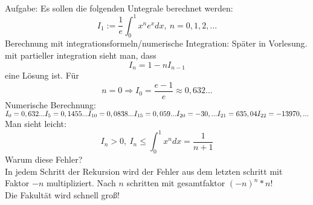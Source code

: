 \documentclass[../Skript.tex]{subfiles}
\begin{document}
\begin{example}\hfill\\
Aufgabe: Es sollen die folgenden Untegrale berechnet werden: $$I_1 := \frac{1}{e}\int^1_0 x^ne^x dx, \ n=0,1,2,...$$
Berechnung mit integrationsformeln/numerische Integration: Später in Vorlesung.\\
mit partieller integration sieht man, dass $$ I_n=1-nI_{n-1}$$
eine Lösung ist.
Für $$n=0 \Rightarrow I_0 = \frac{e-1}{e}\approx 0,632...$$
Numerische Berechnung: 
$I_0=0,632...\\
I_5= 0,1455...\\
I_{10}=0,0838...\\
I_{15}=0,059...\\
I_{20}=-30,...\\
I_{21}=635,04\\
I_{22}=-13970,...$\\
Man sieht leicht: $$I_n>0, \ I_n \leq \int^1_0x^ndx=\frac{1}{n+1}$$
Warum diese Fehler?\\
In jedem Schritt der Rekursion wird der Fehler aus dem letzten schritt mit Faktor $-n$ multipliziert. Nach $n$ schritten mit gesamtfaktor $(-n)^n*n!$\\
Die Fakultät wird schnell groß!
\end{example}
\end{document}
